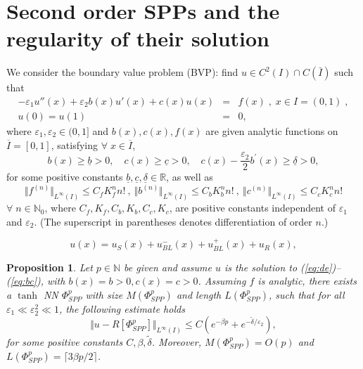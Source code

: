 \documentclass[10pt,a4paper]{amsart}
\newtheorem{proposition}{Proposition}
\newcommand{\ceil}[1]{\lceil #1 \rceil}
\providecommand{\e}{\varepsilon}
\begin{document}
\section{Second order SPPs and the regularity of their solution}
\label{sec:model}
We consider the boundary value problem (BVP): find $u \in C^2(I) \cap C(\bar{I})$ such that
\begin{eqnarray}
-\e_1 u''(x) + \e_2  b(x)u'(x) + c(x) u(x) &=& f(x) \; , \; x \in I = (0,1) \; , \label{eq:de} \\
u(0) =  u(1)&=& 0, \label{eq:bc}
\end{eqnarray}
%
where $\e_1, \e_2 \in (0,1]$ and $b(x), c(x), f(x)$ are given analytic functions on
$\overline{I}=[0,1]$, satisfying $\forall \;x \in \overline{I}$,
$$
b(x) \geq \underline{b}>0, \quad c(x) \geq \underline{c}>0, \quad c(x)-\frac{\varepsilon_2}{2} b^{\prime}(x) \geq \underline{\delta} >0,
$$
%
for some positive constants $\underline{b}, \underline{c}, \underline{\delta} \in \mathbb{R}$, as well as
%
\begin{equation}
\label{eq:analytic}
\Vert f^{(n)} \Vert_{L^{\infty}(I)} \leq C_f K^n_f n! \: , \: \Vert b^{(n)} \Vert_{L^{\infty}(I)} \leq C_b K^n_b n! 
 \: , \: \Vert c^{(n)} \Vert_{L^{\infty}(I)} \leq C_c K^n_c n!
\end{equation}
%
$\forall \; n \in \mathbb{N}_0$,  where $C_f, K_f, C_b, K_b, C_c, K_c$, are positive constants independent of $\e_1$ and  $\e_2$.
(The superscript in parentheses denotes differentiation of order $n$.)

\begin{equation}\label{decomp}
u(x) = u_S(x) + u_{BL}^{-}(x) + u_{BL}^{+}(x) + u_R(x),
\end{equation}

\begin{proposition}\label{prop:NNbl}
Let $p \in \mathbb{N}$ be given and assume $u$ is the solution to (\ref{eq:de})--(\ref{eq:bc}), with $b(x)=b>0, c(x) = c >0$. Assuming $f$ is analytic, there exists a $\tanh$ NN $\Phi^{p}_{{SPP}}$ with size $M(\Phi^{p}_{{SPP}})$ and length $L(\Phi^{p}_{{SPP}})$, such that for all $\e_1 \ll \e_2^2 \ll 1$, the following estimate holds
%
$$
\Vert u - R[\Phi^{p}_{SPP}] \Vert_{L^{\infty}(I)} \leq C \left( e^{-\beta p} + e^{-\tilde{\delta} / \varepsilon_2} \right),
$$
for some positive constants $C, \beta, \tilde{\delta}$. Moreover, $M(\Phi^p_{SPP}) = O(p)$ and $L(\Phi^{p}_{{SPP}})= \ceil{3 \beta p/2}$.
\end{proposition}
\end{document}

